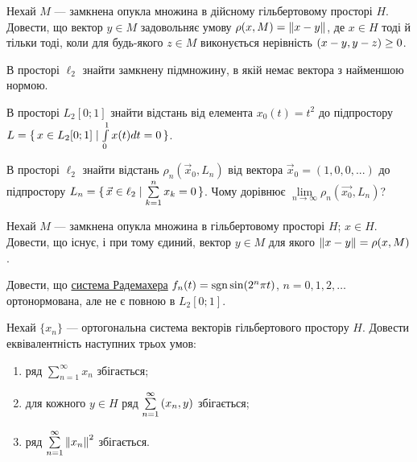 \begin{exercise}
    Нехай $M$ --- замкнена опукла множина в дійсному гільбертовому просторі $H$.
    Довести, що вектор $y \in M$ задовольняє умову $\rho(x, M) = \left\lVert x-y\right\rVert$,
    де $x \in H$ тоді й тільки тоді, коли для будь-якого $z \in M$ виконується
    нерівність $\left(x-y, y-z\right) \geq 0$.
\end{exercise}

\begin{exercise}
    В просторі $\ell_2$ знайти замкнену підмножину, в якій немає вектора з найменшою нормою.
\end{exercise}

\begin{exercise}
    В просторі $L_2[0;1]$ знайти відстань від елемента $x_0(t) = t^2$ до підпростору
    $L = \set{x \in L_2[0;1] \mid \int\limits_0^1x(t)dt = 0}$.
\end{exercise}

\begin{exercise}
    В просторі $\ell_2$ знайти відстань $\rho_n(\vec{x}_0, L_n)$ від вектора $\vec{x}_0 = (1, 0, 0, ...)$ до
    підпростору $L_n = \set{ \vec{x}\in \ell_2 \mid \sum\limits^n_{k=1} x_k = 0}$.
    Чому дорівнює $\lim\limits_{n \to \infty} \rho_n(\vec{x_0}, L_n)$?
\end{exercise}

\begin{exercise}
    Нехай $M$ --- замкнена опукла множина в гільбертовому просторі $H$; $x \in H$.
    Довести, що існує, і при тому єдиний, вектор $y \in M$ для якого $\left\lVert x-y\right\rVert =
    \rho(x, M)$.
\end{exercise}

\begin{exercise}
    Довести, що \underline{система Радемахера} $f_n(t) = \operatorname{sgn}\sin(2^n \pi t)$,
    $n=0,1,2,\dots$ ортонормована, але не є повною в $L_2[0;1]$.
\end{exercise}

\begin{exercise}
    Нехай $\{x_n\}$ --- ортогональна система векторів гільбертового простору $H$.
    Довести еквівалентність наступних трьох умов:
    \begin{enumerate}[label=\ukr*)]
        \item ряд $\sum\limits^\infty_{n=1} x_n$ збігається;
        \item для кожного $y \in H$ ряд $\sum\limits^\infty_{n=1} \left(x_n, y\right)$ збігається;
        \item ряд $\sum\limits^\infty_{n=1} \left\lVert x_n\right\rVert^2$ збігається.
    \end{enumerate}
\end{exercise}


